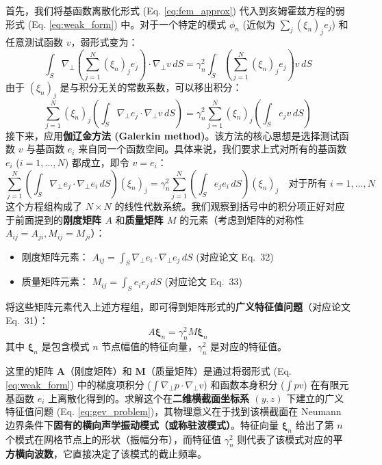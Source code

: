 \documentclass{ctexart}
\begin{document}
首先，我们将基函数离散化形式 (Eq. \eqref{eq:fem_approx}) 代入到亥姆霍兹方程的弱形式 (Eq. \eqref{eq:weak_form}) 中。对于一个特定的模式 $\phi_n$ (近似为 $\sum_j (\xi_n)_j e_j$) 和任意测试函数 $v$，弱形式变为：
\[
\int_S \nabla_\perp \left( \sum_{j=1}^{N} (\xi_n)_j e_j \right) \cdot \nabla_\perp v \, dS = \gamma_n^2 \int_S \left( \sum_{j=1}^{N} (\xi_n)_j e_j \right) v \, dS
\]
由于 $(\xi_n)_j$ 是与积分无关的常数系数，可以移出积分：
\[
\sum_{j=1}^{N} (\xi_n)_j \left( \int_S \nabla_\perp e_j \cdot \nabla_\perp v \, dS \right) = \gamma_n^2 \sum_{j=1}^{N} (\xi_n)_j \left( \int_S e_j v \, dS \right)
\]
接下来，应用\textbf{伽辽金方法 (Galerkin method)}。该方法的核心思想是选择测试函数 $v$ 与基函数 $e_i$ 来自同一个函数空间。具体来说，我们要求上式对所有的基函数 $e_i$ ($i=1, \dots, N$) 都成立，即令 $v = e_i$：
\[
\sum_{j=1}^{N} \left( \int_S \nabla_\perp e_j \cdot \nabla_\perp e_i \, dS \right) (\xi_n)_j = \gamma_n^2 \sum_{j=1}^{N} \left( \int_S e_j e_i \, dS \right) (\xi_n)_j \quad \text{对于所有 } i = 1, \dots, N
\]
这个方程组构成了 $N \times N$ 的线性代数系统。我们观察到括号中的积分项正好对应于前面提到的\textbf{刚度矩阵 $A$} 和\textbf{质量矩阵 $M$} 的元素（考虑到矩阵的对称性 $A_{ij}=A_{ji}, M_{ij}=M_{ji}$）：
\begin{itemize}
    \item 刚度矩阵元素： $A_{ij} = \int_S \nabla_\perp e_i \cdot \nabla_\perp e_j \, dS$ (对应论文 Eq.~32)
    \item 质量矩阵元素： $M_{ij} = \int_S e_i e_j \, dS$ (对应论文 Eq.~33)
\end{itemize}
将这些矩阵元素代入上述方程组，即可得到矩阵形式的\textbf{广义特征值问题}（对应论文 Eq.~31）：
\begin{equation} \label{eq:gev_problem}
A \boldsymbol{\xi}_n = \gamma_n^2 M \boldsymbol{\xi}_n
\end{equation}
其中 $\boldsymbol{\xi}_n$ 是包含模式 $n$ 节点幅值的特征向量，$\gamma_n^2$ 是对应的特征值。

这里的矩阵 $\mathbf{A}$（刚度矩阵）和 $\mathbf{M}$（质量矩阵）是通过将弱形式 (Eq. \eqref{eq:weak_form}) 中的梯度项积分 ($\int \nabla_\perp p \cdot \nabla_\perp v$) 和函数本身积分 ($\int p v$) 在有限元基函数 $e_i$ 上离散化得到的。求解这个在\textbf{二维横截面坐标系 $(y, z)$} 下建立的广义特征值问题 (Eq. \eqref{eq:gev_problem})，其物理意义在于找到该横截面在 Neumann 边界条件下\textbf{固有的横向声学振动模式（或称驻波模式）}。特征向量 $\boldsymbol{\xi}_n$ 给出了第 $n$ 个模式在网格节点上的形状（振幅分布），而特征值 $\gamma_n^2$ 则代表了该模式对应的\textbf{平方横向波数}，它直接决定了该模式的截止频率。
\end{document}
